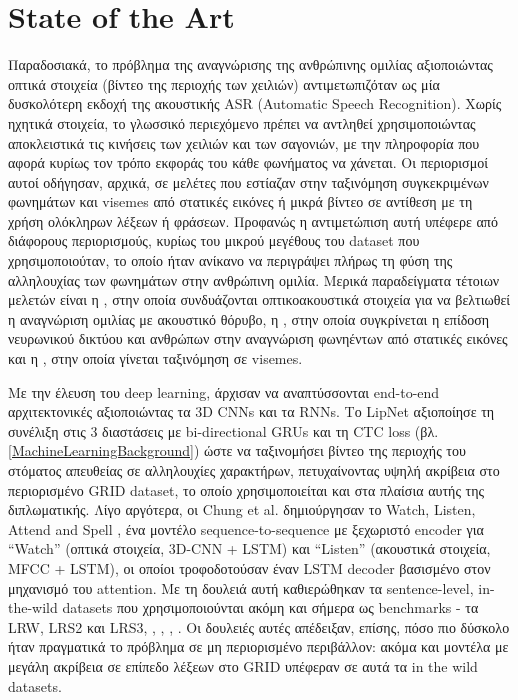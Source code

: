 \section{State of the Art}
\label{StateOfTheArt}

Παραδοσιακά, το πρόβλημα της αναγνώρισης της ανθρώπινης ομιλίας αξιοποιώντας οπτικά στοιχεία (βίντεο της περιοχής των χειλιών) αντιμετωπιζόταν ως μία δυσκολότερη εκδοχή της ακουστικής ASR (Automatic Speech Recognition). Χωρίς ηχητικά στοιχεία, το γλωσσικό περιεχόμενο πρέπει να αντληθεί χρησιμοποιώντας αποκλειστικά τις κινήσεις των χειλιών και των σαγονιών, με την πληροφορία που αφορά κυρίως τον τρόπο εκφοράς του κάθε φωνήματος να χάνεται. Οι περιορισμοί αυτοί οδήγησαν, αρχικά, σε μελέτες που εστίαζαν στην ταξινόμηση συγκεκριμένων φωνημάτων και visemes από στατικές εικόνες ή μικρά βίντεο σε αντίθεση με τη χρήση ολόκληρων λέξεων ή φράσεων. Προφανώς η αντιμετώπιση αυτή υπέφερε από διάφορους περιορισμούς, κυρίως του μικρού μεγέθους του dataset που χρησιμοποιούταν, το οποίο ήταν ανίκανο να περιγράψει πλήρως τη φύση της αλληλουχίας των φωνημάτων στην ανθρώπινη ομιλία. Μερικά παραδείγματα τέτοιων μελετών είναι η \cite{Yuhas1989IntegrationOA}, στην οποία συνδυάζονται οπτικοακουστικά στοιχεία για να βελτιωθεί η αναγνώριση ομιλίας με ακουστικό θόρυβο, η \cite{10.1121/1.401235}, στην οποία συγκρίνεται η επίδοση νευρωνικού δικτύου και ανθρώπων στην αναγνώριση φωνηέντων από στατικές εικόνες και η \cite{inbook}, στην οποία γίνεται ταξινόμηση σε visemes.

Με την έλευση του deep learning, άρχισαν να αναπτύσσονται end-to-end αρχιτεκτονικές αξιοποιώντας τα 3D CNNs και τα RNNs. Το LipNet \cite{assael2016lipnetendtoendsentencelevellipreading} αξιοποίησε τη συνέλιξη στις 3 διαστάσεις με bi-directional GRUs και τη CTC loss (βλ. \ref{MachineLearningBackground}) ώστε να ταξινομήσει βίντεο της περιοχής του στόματος απευθείας σε αλληλουχίες χαρακτήρων, πετυχαίνοντας υψηλή ακρίβεια στο περιορισμένο GRID dataset, το οποίο χρησιμοποιείται και στα πλαίσια αυτής της διπλωματικής. Λίγο αργότερα, οι Chung et al. δημιούργησαν το Watch, Listen, Attend and Spell \cite{Chung17}, ένα μοντέλο sequence-to-sequence με ξεχωριστό encoder για ``Watch'' (οπτικά στοιχεία, 3D-CNN + LSTM) και ``Listen'' (ακουστικά στοιχεία, MFCC + LSTM), οι οποίοι τροφοδοτούσαν έναν LSTM decoder βασισμένο στον μηχανισμό του attention. Με τη δουλειά αυτή καθιερώθηκαν τα sentence-level, in-the-wild datasets που χρησιμοποιούνται ακόμη και σήμερα ως benchmarks - τα LRW, LRS2 και LRS3, \cite{Afouras18c}, \cite{Chung16}, \cite{Chung17}, \cite{Chung17a}. Οι δουλειές αυτές απέδειξαν, επίσης, πόσο πιο δύσκολο ήταν πραγματικά το πρόβλημα σε μη περιορισμένο περιβάλλον: ακόμα και μοντέλα με μεγάλη ακρίβεια σε επίπεδο λέξεων στο GRID υπέφεραν σε αυτά τα in the wild datasets.

